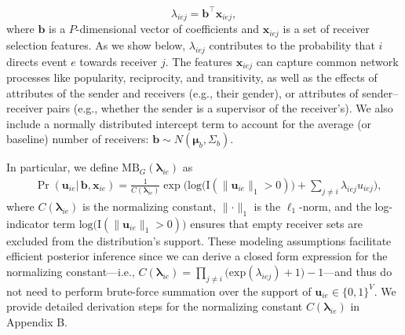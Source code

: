 \documentclass[ba]{imsart}
\numberwithin{equation}{section}
\theoremstyle{plain}
\begin{document}
	\begin{equation}
	\lambda_{iej} = {\boldsymbol{b}}^{\top}\boldsymbol{x}_{iej},
	\end{equation}
	where $\boldsymbol{b}$ is a $P$-dimensional vector of coefficients and $\boldsymbol{x}_{iej}$ is a set of receiver selection features. As we show below, $\lambda_{iej}$ contributes to the probability that $i$ directs event $e$ towards receiver $j$. The features $\boldsymbol{x}_{iej}$ can capture common network processes like popularity, reciprocity, and transitivity, as well as the effects of attributes of the sender and receivers (e.g., their gender), or attributes of sender--receiver pairs (e.g., whether the sender is a supervisor of the receiver's). We also include a normally distributed intercept term to account for the average (or baseline) number of receivers: $\boldsymbol{b} \sim N(\boldsymbol{\mu}_b, \Sigma_b)$. ~
	
	In particular, we define $\mbox{MB}_{G}(\boldsymbol{\lambda}_{ie})$ as
	\begin{equation}
		\begin{aligned}
			&\Pr(\boldsymbol{u}_{ie}|\,\boldsymbol{b}, \boldsymbol{x}_{ie}) = \frac{1}{C(\boldsymbol{\lambda}_{ie})}\exp\Big(\mbox{log}\big(\text{I}( \lVert \boldsymbol{u}_{ie}\rVert_1 > 0 )\big) + \sum_{j\neq i} \lambda_{iej}u_{iej}\Big) ,
		\end{aligned}
		\label{eqn:Gibbs}
	\end{equation}
	where $C(\boldsymbol{\lambda}_{ie})$ is the normalizing constant, $\lVert \cdot \rVert_1$ is the $\ell_1$-norm, and the log-indicator term $\mbox{log}\big(\text{I}( \lVert \boldsymbol{u}_{ie}\rVert_1 > 0 )\big)$ ensures that empty receiver sets are excluded from the distribution's support. These modeling assumptions facilitate efficient posterior inference since we can derive a closed form expression for the normalizing constant---i.e., $C(\boldsymbol{\lambda}_{ie})= \prod_{j\neq i} \big(\mbox{exp}(\lambda_{iej}) + 1\big)-1$---and thus do not need to perform brute-force summation over the support of $\boldsymbol{u}_{ie} \in \{0,1\}^V$. We provide detailed derivation steps for the normalizing constant $C(\boldsymbol{\lambda}_{ie})$ in Appendix B.

	
\end{document}
